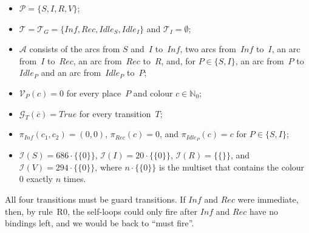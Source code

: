 \documentclass[11pt]{article}
\theoremstyle{definition}
\newcommand{\NatZero}{\mathbb{N}_0}
\newcommand{\mset}[1]{\{\!\{#1\}\!\}}
\newcommand{\cvec}{\overline{c}}
\begin{document}
\begin{itemize}
  \item $\mathcal{P} = \{S, I, R, V\}$;

  \item $\mathcal{T} = \mathcal{T}_G = \{\mathit{Inf}, \mathit{Rec},
    \mathit{Idle}_S, \mathit{Idle}_I\}$ and $\mathcal{T}_I = \emptyset$;

  \item $\mathcal{A}$ consists of the arcs from $S$ and~$I$
    to~$\mathit{Inf}$, two arcs from~$\mathit{Inf}$ to~$I$, an arc from~$I$
    to~$\mathit{Rec}$, an arc from~$\mathit{Rec}$ to~$R$, and, for
    $P \in \{S, I\}$, an arc from~$P$ to~$\mathit{Idle}_P$ and an arc
    from~$\mathit{Idle}_P$ to~$P$;

  \item $\mathcal{V}_P(c) = 0$ for every place~$P$ and colour $c \in
    \NatZero$;

  \item $\mathcal{G}_T(\cvec) = \mathit{True}$ for every transition~$T$;

  \item $\pi_{\mathit{Inf}}(c_1, c_2) = (0, 0)$,
    $\pi_{\mathit{Rec}}(c) = 0$, and $\pi_{\mathit{Idle}_P}(c) = c$ for
    $P \in \{S, I\}$;

  \item $\mathcal{I}(S) = 686 \cdot \mset{0}$,
    $\mathcal{I}(I) = 20 \cdot \mset{0}$, $\mathcal{I}(R) = \mset{}$, and
    $\mathcal{I}(V) = 294 \cdot \mset{0}$, where $n \cdot \mset{0}$ is the
    multiset that contains the colour~$0$ exactly $n$ times.
\end{itemize}

All four transitions must be guard transitions. If $\mathit{Inf}$ and
$\mathit{Rec}$ were immediate, then, by rule~R0, the self-loops could only
fire after $\mathit{Inf}$ and $\mathit{Rec}$ have no bindings left, and we
would be back to ``must fire''.
\end{document}
